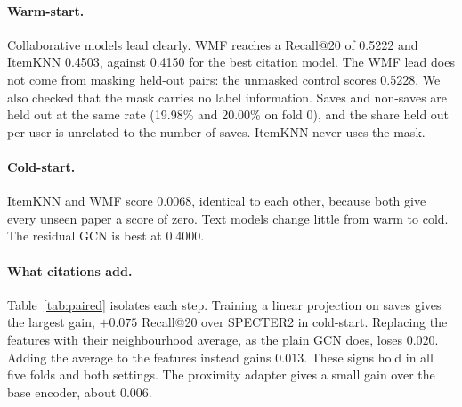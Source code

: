 \documentclass[10pt]{article}
\begin{document}
\begin{table}[t]
\centering\small
\caption{Warm-start test results (mean over five folds). Best value in bold.}
\label{tab:warm}
\end{table}

\begin{table}[t]
\centering\small
\caption{Cold-start test results (mean over five folds). Best value in bold. $\dagger$: no signal for unseen papers, so the ranking is a random permutation. Node2Vec on the user--paper graph cannot embed cold papers and is omitted.}
\label{tab:cold}
\end{table}

\paragraph{Warm-start.} Collaborative models lead clearly. WMF reaches a Recall@20 of 0.5222 and ItemKNN 0.4503, against 0.4150 for the best citation model. The WMF lead does not come from masking held-out pairs: the unmasked control scores 0.5228. We also checked that the mask carries no label information. Saves and non-saves are held out at the same rate (19.98\% and 20.00\% on fold 0), and the share held out per user is unrelated to the number of saves. ItemKNN never uses the mask.

\paragraph{Cold-start.} ItemKNN and WMF score 0.0068, identical to each other, because both give every unseen paper a score of zero. Text models change little from warm to cold. The residual GCN is best at 0.4000.

\paragraph{What citations add.} Table~\ref{tab:paired} isolates each step. Training a linear projection on saves gives the largest gain, $+0.075$ Recall@20 over SPECTER2 in cold-start. Replacing the features with their neighbourhood average, as the plain GCN does, loses $0.020$. Adding the average to the features instead gains $0.013$. These signs hold in all five folds and both settings. The proximity adapter gives a small gain over the base encoder, about $0.006$.
\end{document}

